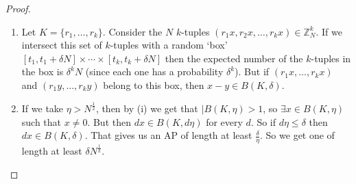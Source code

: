 \documentclass{article}
\newcommand{\1}[1]{\mathbbm{1}_{#1}}
\begin{document}
\begin{proof}\leavevmode
  \begin{enumerate}[label=(\roman*)]
    \item Let $K = \{r_1, \dotsc, r_k\}$. Consider the $N$ $k$-tuples $(r_1 x, r_2 x, \dotsc, r_k x) \in \mathbb{Z}_N^k$.
      If we intersect this set of $k$-tuples with a random `box' $[t_1, t_1 + \delta N] \times \dotsm \times [t_k, t_k + \delta N]$
      then the expected number of the $k$-tuples in the box is $\delta^k N$ (since each one has a probability $\delta^k$).
      But if $(r_1 x, \dotsc, r_k x)$ and $(r_1 y, \dotsc, r_k y)$ belong to this box, then $x - y \in B(K, \delta)$.
    \item If we take $\eta > N^{\frac{1}{2}}$, then by (i) we get that $|B(K, \eta) > 1$, so $\exists x \in B(K, \eta)$ such that $x \neq 0$.
      But then $d x \in B(K, d \eta)$ for every $d$.
      So if $d \eta \leq \delta$ then $d x \in B(K, \delta)$. That gives us an AP of length at least $\frac{\delta}{\eta}$.
      So we get one of length at least $\delta N^\frac{1}{k}$.
  \end{enumerate}
\end{proof}
\end{document}
